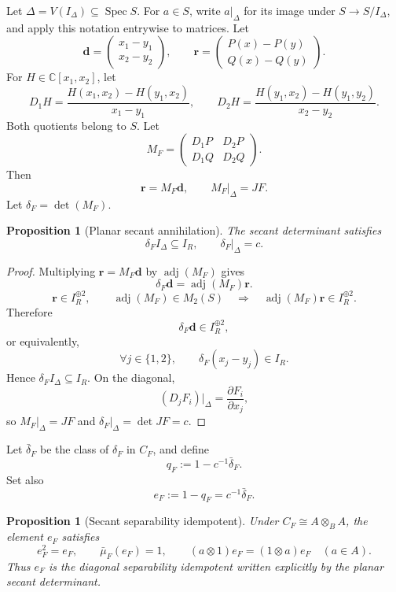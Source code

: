 \documentclass[11pt]{article}
\newtheorem{proposition}[theorem]{Proposition}
\theoremstyle{remark}
\theoremstyle{definition}
\DeclareMathOperator{\Spec}{Spec}
\newcommand{\C}{\mathbb C}
\begin{document}
Let \(\Delta=V(I_\Delta)\subseteq\Spec S\).  For \(a\in S\), write
\(a|_\Delta\) for its image under \(S\to S/I_\Delta\), and apply this
notation entrywise to matrices.
Let
\[
  \mathbf d=
  \begin{pmatrix}
    x_1-y_1\\
    x_2-y_2
  \end{pmatrix},
  \qquad
  \mathbf r=
  \begin{pmatrix}
    P(x)-P(y)\\
    Q(x)-Q(y)
  \end{pmatrix}.
\]
For \(H\in\C[x_1,x_2]\), let
\[
  D_1H
  =
  \frac{H(x_1,x_2)-H(y_1,x_2)}{x_1-y_1},
  \qquad
  D_2H
  =
  \frac{H(y_1,x_2)-H(y_1,y_2)}{x_2-y_2}.
\]
Both quotients belong to \(S\).  Let
\[
  M_F=
  \begin{pmatrix}
    D_1P&D_2P\\
    D_1Q&D_2Q
  \end{pmatrix}.
\]
Then
\[
  \mathbf r=M_F\mathbf d,
  \qquad
  M_F\big|_\Delta=JF.
\]
Let \(\delta_F=\det(M_F)\).

\begin{proposition}[Planar secant annihilation]
\label{prop:secant-annihilator}
The secant determinant satisfies
\[
  \delta_F I_\Delta\subseteq I_R,
  \qquad
  \delta_F\big|_\Delta=c.
\]
\end{proposition}

\begin{proof}
Multiplying \(\mathbf r=M_F\mathbf d\) by
\(\operatorname{adj}(M_F)\) gives
\[
  \delta_F\mathbf d=\operatorname{adj}(M_F)\mathbf r.
\]
\[
  \mathbf r\in I_R^{\oplus2},
  \qquad
  \operatorname{adj}(M_F)\in M_2(S)
  \quad\Longrightarrow\quad
  \operatorname{adj}(M_F)\mathbf r\in I_R^{\oplus2}.
\]
Therefore
\[
  \delta_F\mathbf d\in I_R^{\oplus2},
\]
or equivalently,
\[
  \forall j\in\{1,2\},
  \qquad
  \delta_F(x_j-y_j)\in I_R.
\]
Hence \(\delta_FI_\Delta\subseteq I_R\).  On the diagonal,
\[
  (D_jF_i)|_\Delta=\frac{\partial F_i}{\partial x_j},
\]
so \(M_F|_\Delta=JF\) and
\(\delta_F|_\Delta=\det JF=c\).
\end{proof}

Let \(\bar\delta_F\) be the class of \(\delta_F\) in \(C_F\), and define
\[
  q_F:=1-c^{-1}\bar\delta_F.
\]
Set also
\[
  e_F:=1-q_F=c^{-1}\bar\delta_F.
\]

\begin{proposition}[Secant separability idempotent]
\label{prop:secant-separability-idempotent}
Under \(C_F\cong A\otimes_BA\), the element \(e_F\) satisfies
\[
  e_F^2=e_F,
  \qquad
  \bar\mu_F(e_F)=1,
  \qquad
  (a\otimes1)e_F=(1\otimes a)e_F
  \quad(a\in A).
\]
Thus \(e_F\) is the diagonal separability idempotent written explicitly by
the planar secant determinant.
\end{proposition}
\end{document}
